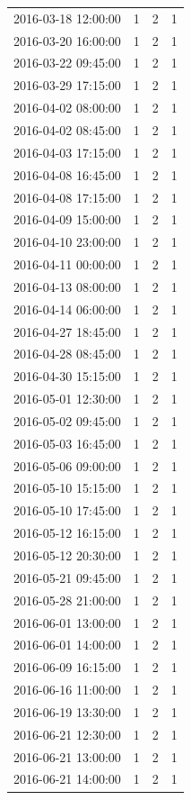 \begin{tabular}{lrrr}
2016-03-18 12:00:00 & 1 & 2 & 1 \\
2016-03-20 16:00:00 & 1 & 2 & 1 \\
2016-03-22 09:45:00 & 1 & 2 & 1 \\
2016-03-29 17:15:00 & 1 & 2 & 1 \\
2016-04-02 08:00:00 & 1 & 2 & 1 \\
2016-04-02 08:45:00 & 1 & 2 & 1 \\
2016-04-03 17:15:00 & 1 & 2 & 1 \\
2016-04-08 16:45:00 & 1 & 2 & 1 \\
2016-04-08 17:15:00 & 1 & 2 & 1 \\
2016-04-09 15:00:00 & 1 & 2 & 1 \\
2016-04-10 23:00:00 & 1 & 2 & 1 \\
2016-04-11 00:00:00 & 1 & 2 & 1 \\
2016-04-13 08:00:00 & 1 & 2 & 1 \\
2016-04-14 06:00:00 & 1 & 2 & 1 \\
2016-04-27 18:45:00 & 1 & 2 & 1 \\
2016-04-28 08:45:00 & 1 & 2 & 1 \\
2016-04-30 15:15:00 & 1 & 2 & 1 \\
2016-05-01 12:30:00 & 1 & 2 & 1 \\
2016-05-02 09:45:00 & 1 & 2 & 1 \\
2016-05-03 16:45:00 & 1 & 2 & 1 \\
2016-05-06 09:00:00 & 1 & 2 & 1 \\
2016-05-10 15:15:00 & 1 & 2 & 1 \\
2016-05-10 17:45:00 & 1 & 2 & 1 \\
2016-05-12 16:15:00 & 1 & 2 & 1 \\
2016-05-12 20:30:00 & 1 & 2 & 1 \\
2016-05-21 09:45:00 & 1 & 2 & 1 \\
2016-05-28 21:00:00 & 1 & 2 & 1 \\
2016-06-01 13:00:00 & 1 & 2 & 1 \\
2016-06-01 14:00:00 & 1 & 2 & 1 \\
2016-06-09 16:15:00 & 1 & 2 & 1 \\
2016-06-16 11:00:00 & 1 & 2 & 1 \\
2016-06-19 13:30:00 & 1 & 2 & 1 \\
2016-06-21 12:30:00 & 1 & 2 & 1 \\
2016-06-21 13:00:00 & 1 & 2 & 1 \\
2016-06-21 14:00:00 & 1 & 2 & 1 \\

\end{tabular}
